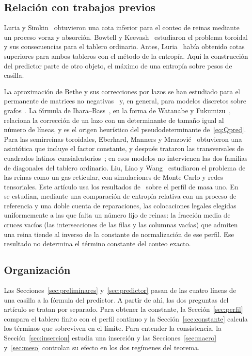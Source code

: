 \subsection*{Relación con trabajos previos}

Luria y Simkin~\cite{LS} obtuvieron una cota inferior para el conteo de reinas mediante un
proceso voraz y absorción. Bowtell y Keevash~\cite{BK} estudiaron el problema toroidal y sus
consecuencias para el tablero ordinario. Antes, Luria~\cite{Luria} había obtenido cotas superiores
para ambos tableros con el método de la entropía. Aquí la construcción del predictor parte de otro
objeto, el máximo de una entropía sobre pesos de casilla.

La aproximación de Bethe y sus correcciones por lazos se han estudiado para el permanente de matrices
no negativas~\cite{Vontobel,WC} y, en general, para modelos discretos sobre grafos~\cite{CC,WF,YFW}.
La fórmula de Ihara--Bass~\cite{Bass}, en la forma de Watanabe y Fukumizu~\cite{WF}, relaciona la
corrección de un lazo con un determinante de tamaño igual al número de líneas, y es el origen
heurístico del pseudodeterminante de~\eqref{eq:Qpred}.
Para las semirreinas toroidales, Eberhard, Manners y Mrazović~\cite{EMM19} obtuvieron una asintótica
que incluye el factor constante, y después trataron las transversales de cuadrados latinos
cuasialeatorios~\cite{EMM}; en esos modelos no intervienen las dos familias de diagonales del tablero
ordinario. Liu, Liao y Wang~\cite{LLW} estudiaron el problema de las reinas como un gas reticular, con
simulaciones de Monte Carlo y redes tensoriales.
Este artículo usa los resultados de~\cite{Perfil} sobre el perfil de masa uno. En~\cite{Completabilidad}
se estudian, mediante una comparación de entropía relativa con un proceso de referencia y una doble
cuenta de reparaciones, las colocaciones legales elegidas uniformemente a las que falta un número fijo
de reinas: la fracción media de cruces vacíos (las intersecciones de las filas y las columnas vacías)
que admiten una reina tiende al inverso de la constante de normalización de ese perfil. Ese resultado
no determina el término constante del conteo exacto.

\subsection*{Organización}

Las Secciones~\ref{sec:preliminares} y~\ref{sec:predictor} pasan de las cuatro líneas de una
casilla a la fórmula del predictor. A partir de ahí, las dos preguntas del artículo se tratan por
separado. Para obtener la constante, la Sección~\ref{sec:perfil} compara el tablero finito con el
perfil continuo y la Sección~\ref{sec:constante} calcula los términos que sobreviven en el límite.
Para entender la consistencia, la Sección~\ref{sec:insercion} estudia una inserción y las
Secciones~\ref{sec:macro} y~\ref{sec:meso} controlan su efecto en los dos regímenes del teorema.

